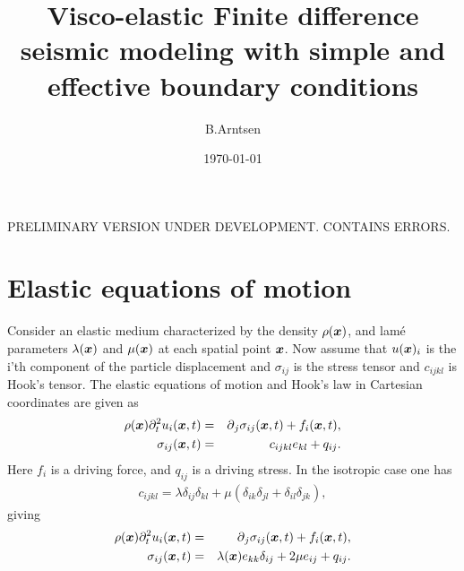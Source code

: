 \documentclass[11pt]{article}
\begin{document}
  
%
\newcommand{\dt}[1]{\partial_t{#1}}
\newcommand{\ddt}[1]{\partial^2_t{#1}}
\newcommand{\dddt}[1]{\partial^3_t{#1}}
\newcommand{\inv}[1]{\frac{1}{#1}}
\newcommand{\diff}[1]{D^+_{#1}}
\newcommand{\difb}[1]{D^-_{#1}}
\title{Visco-elastic Finite difference seismic modeling with 
       simple and effective boundary conditions}
\author{B.Arntsen}
\date{\today}
\maketitle
\clearpage
PRELIMINARY VERSION UNDER DEVELOPMENT. CONTAINS ERRORS.
\section*{Elastic equations of motion} 
Consider an elastic medium characterized by the density $\rho(\mbox{\boldmath $x$})$, 
and lam\'{e}
parameters $\lambda(\mbox{\boldmath $x$})$ and $\mu(\mbox{\boldmath $x$})$ at each spatial point $\mbox{\boldmath $x$}$.
Now assume that $u(\mbox{\boldmath $x$})_i$ is the i'th component of the particle displacement 
and
$\sigma_{ij}$ is the stress tensor and $c_{ijkl}$ is Hook's tensor.
The elastic equations of motion and Hook's law in Cartesian coordinates are
given as
%
\begin{eqnarray}
  \rho(\xx) \ddt{u_i(\xx, t)} & = & \p_j \sigma_{ij}(\xx, t) +f_i(\xx,t),\\
					   \label{eq:el-eqm}
        \sigma_{ij}(\xx,t)    & = & c_{ijkl}e_{kl} +q_{ij}.
					  \label{eq:el-cse}
\end{eqnarray}
%
Here $f_i$ is a driving force, and $q_{ij}$ is a driving stress.
In the isotropic case one has
%
\begin{eqnarray}
   c_{ijkl} = \lambda\delta_{ij}\delta_{kl} + \mu\left(\delta_{ik}\delta_{jl} + \delta_{il}\delta_{jk}\right),
                                 \label{eq:el-moduli}
\end{eqnarray}
%
giving
%
\begin{eqnarray}
  \rho(\xx) \ddt{u_i(\xx, t)} & = & \p_j \sigma_{ij}(\xx, t) +f_i(\xx,t),\\
					   \label{eq:iso-elm}
  \sigma_{ij}(\xx, t) & = & 
        \lambda(\xx) e_{kk}\delta_{ij} + 2\mu e_{ij} +q_{ij}.
					  \label{eq:iso-cse}
\end{eqnarray}
\end{document}
